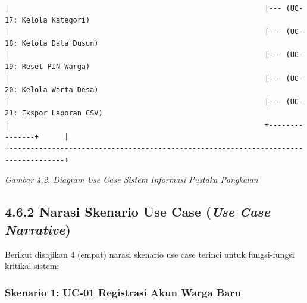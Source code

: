 \documentclass[
  indonesian,
  12pt,
]{report}
\begin{document}
\begin{verbatim}
|                                                            |--- (UC-17: Kelola Kategori)
|                                                            |--- (UC-18: Kelola Data Dusun)
|                                                            |--- (UC-19: Reset PIN Warga)
|                                                            |--- (UC-20: Kelola Warta Desa)
|                                                            |--- (UC-21: Ekspor Laporan CSV)
|                                                            +---------------+      |
+-----------------------------------------------------------------------------------+
\end{verbatim}

\emph{Gambar 4.2. Diagram Use Case Sistem Informasi Pustaka Pangkalan}

\subsection{\texorpdfstring{4.6.2 Narasi Skenario Use Case (\emph{Use
Case
Narrative})}{4.6.2 Narasi Skenario Use Case (Use Case Narrative)}}\label{narasi-skenario-use-case-use-case-narrative}

Berikut disajikan 4 (empat) narasi skenario use case terinci untuk
fungsi-fungsi kritikal sistem:

\subsubsection{Skenario 1: UC-01 Registrasi Akun Warga
Baru}\label{skenario-1-uc-01-registrasi-akun-warga-baru}
\end{document}
